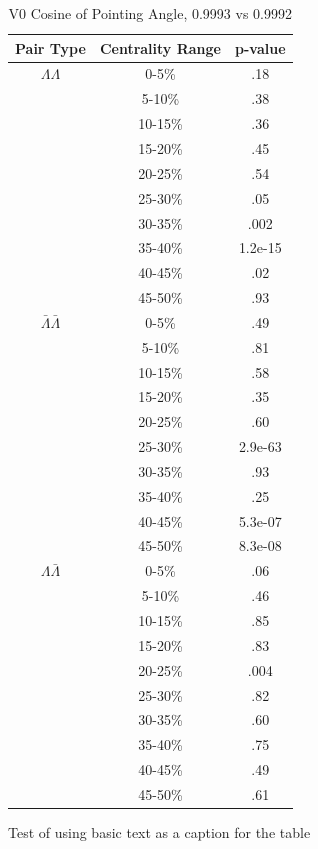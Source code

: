 \begin{table}
\caption {V0 Cosine of Pointing Angle, 0.9993 vs 0.9992} \label{tab:V0CosPointingPvalueTests9993vs9992}
\begin{center}
\begin{tabular}{| c | c | c |}
  \hline                       
  Pair Type & Centrality Range & p-value \\
  \hline
  $\Lambda\Lambda$ & 0-5\% & .18 \\
   & 5-10\%  & .38 \\
   & 10-15\% & .36 \\
   & 15-20\% & .45 \\
   & 20-25\% & .54 \\
   & 25-30\% & .05 \\
   & 30-35\% & .002 \\
   & 35-40\% & 1.2e-15 \\
   & 40-45\% & .02 \\
   & 45-50\% & .93 \\
   \hline
  $\bar{\Lambda}\bar{\Lambda}$ &  0-5\% & .49 \\
   & 5-10\% & .81 \\
   & 10-15\% & .58 \\
   & 15-20\% & .35 \\
   & 20-25\% & .60 \\
   & 25-30\% & 2.9e-63 \\
   & 30-35\% & .93 \\
   & 35-40\% & .25 \\
   & 40-45\% & 5.3e-07 \\
   & 45-50\% & 8.3e-08 \\
   \hline
  $\Lambda\bar{\Lambda}$ &  0-5\% & .06 \\
   & 5-10\% & .46 \\
   & 10-15\% & .85 \\
   & 15-20\% & .83 \\
   & 20-25\% & .004 \\
   & 25-30\% & .82 \\
   & 30-35\% & .60 \\
   & 35-40\% & .75 \\
   & 40-45\% & .49 \\
   & 45-50\% & .61 \\
  \hline  
\end{tabular}
Test of using basic text as a caption for the table
\end{center}
\end{table}




